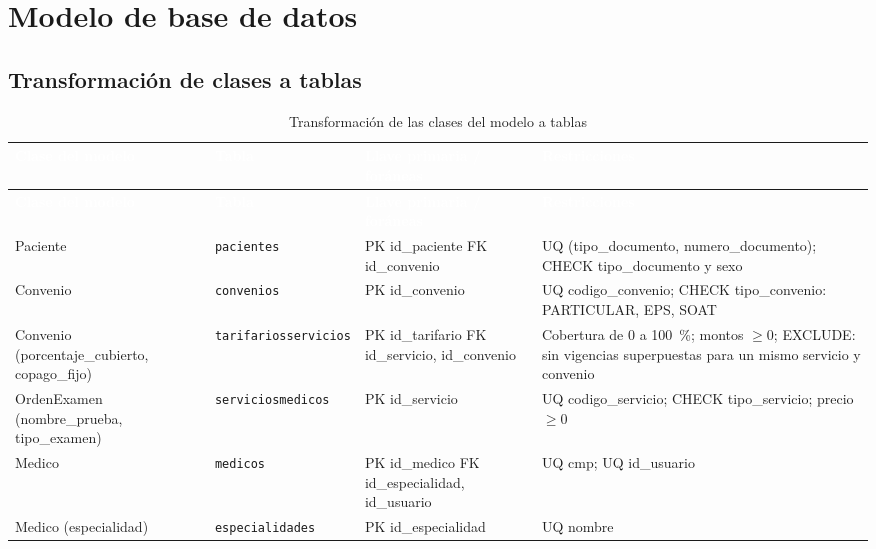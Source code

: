\documentclass[11pt,a4paper]{article}
\newcommand{\cab}[1]{\textcolor{white}{\textbf{#1}}}
\newcommand{\tb}[1]{{\renewcommand{\_}{\textunderscore\allowbreak}\texttt{#1}}}
\begin{document}
\newpage
\section{Modelo de base de datos}\label{sec:modelo}

\subsection{Transformación de clases a tablas}

\begingroup\small
\begin{xltabular}{\linewidth}{|P{3.1cm}|P{3.2cm}|P{4cm}|L|}
  \caption{Transformación de las clases del modelo a tablas}\label{tab:clases-tablas}\\
  \hline
  \cab{Clase del modelo} & \cab{Tabla} & \cab{Llave primaria / foráneas} & \cab{Restricciones} \\ \hline
  \endfirsthead
  \hline
  \cab{Clase del modelo} & \cab{Tabla} & \cab{Llave primaria / foráneas} & \cab{Restricciones} \\ \hline
  \endhead
  Paciente & \texttt{pacientes} &
    PK id\_paciente \newline FK id\_convenio &
    UQ (tipo\_documento, numero\_documento); CHECK tipo\_documento y sexo \\ \hline
  Convenio & \texttt{convenios} &
    PK id\_convenio &
    UQ codigo\_convenio; CHECK tipo\_convenio: PARTICULAR, EPS, SOAT \\ \hline
  Convenio (porcentaje\_cubierto, copago\_fijo) & \tb{tarifarios\_servicios} &
    PK id\_tarifario \newline FK id\_servicio, id\_convenio &
    Cobertura de 0 a 100~\%; montos $\geq 0$; EXCLUDE: sin vigencias superpuestas para un mismo servicio y convenio \\ \hline
  OrdenExamen (nombre\_prueba, tipo\_examen) & \tb{servicios\_medicos} &
    PK id\_servicio &
    UQ codigo\_servicio; CHECK tipo\_servicio; precio $\geq 0$ \\ \hline
  Medico & \texttt{medicos} &
    PK id\_medico \newline FK id\_especialidad, id\_usuario &
    UQ cmp; UQ id\_usuario \\ \hline
  Medico (especialidad) & \texttt{especialidades} &
    PK id\_especialidad &
    UQ nombre \\ \hline

\end{xltabular}
\end{document}
